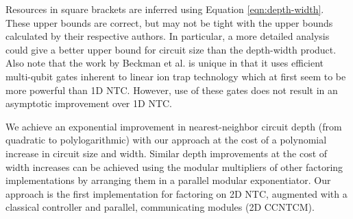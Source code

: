 Resources in square brackets
are inferred using Equation \ref{eqn:depth-width}.
These upper bounds are correct,
but may not be tight with the upper bounds
calculated by their respective authors.
In particular, a more detailed analysis
could give a better upper bound for circuit size than the
depth-width product. Also note that the
work by Beckman et al. \cite{Beckman1996} is unique in that it uses
efficient multi-qubit gates inherent to linear ion trap technology which at first
seem to
be more powerful than \textsc{1D NTC}. However, use of these gates does not result in an
asymptotic improvement over \textsc{1D NTC}.

We achieve an exponential
improvement in nearest-neighbor circuit depth (from quadratic to polylogarithmic)
with our approach at the cost of a polynomial increase in
circuit size and width. Similar depth improvements at the cost of width increases can be achieved using the modular multipliers
of other factoring implementations
by arranging them in a parallel modular exponentiator.
Our approach is the first implementation for factoring on \textsc{2D NTC},
augmented with a classical controller and parallel, communicating
modules (\textsc{2D CCNTCM}).
%
